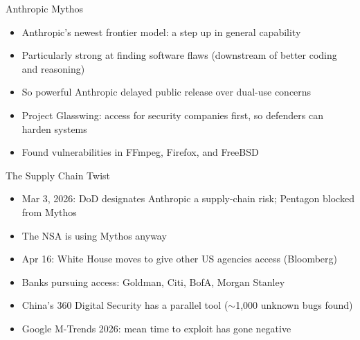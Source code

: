 \documentclass[aspectratio=169]{beamer}
\begin{document}

\begin{frame}{Anthropic Mythos}
    \begin{itemize}
        \item Anthropic's newest frontier model: a step up in general capability
        \vspace{0.4em}
        \item Particularly strong at finding software flaws (downstream of better coding and reasoning)
        \vspace{0.4em}
        \item So powerful Anthropic delayed public release over dual-use concerns
        \vspace{0.4em}
        \item Project Glasswing: access for security companies first, so defenders can harden systems
        \vspace{0.4em}
        \item Found vulnerabilities in FFmpeg, Firefox, and FreeBSD
    \end{itemize}
\end{frame}

\begin{frame}{The Supply Chain Twist}
    \begin{itemize}
        \item Mar 3, 2026: DoD designates Anthropic a supply-chain risk; Pentagon blocked from Mythos
        \vspace{0.3em}
        \item The NSA is using Mythos anyway
        \vspace{0.3em}
        \item Apr 16: White House moves to give other US agencies access (Bloomberg)
        \vspace{0.3em}
        \item Banks pursuing access: Goldman, Citi, BofA, Morgan Stanley
        \vspace{0.3em}
        \item China's 360 Digital Security has a parallel tool ($\sim$1{,}000 unknown bugs found)
        \vspace{0.3em}
        \item Google M-Trends 2026: mean time to exploit has gone negative
    \end{itemize}
\end{frame}
\end{document}
